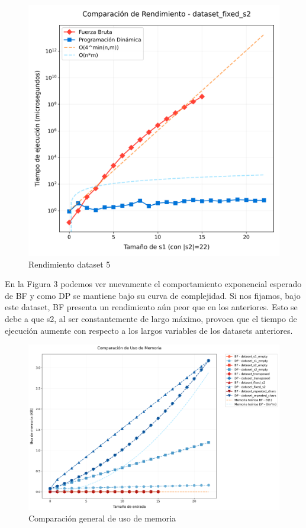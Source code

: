 \begin{figure}[H]
    \centering
    \begin{minipage}[t]{0.5\textwidth}
        \includegraphics[width=\textwidth]{images/comparacion_dataset_fixed_s2.png}  
    \end{minipage}%
    \caption{Rendimiento dataset 5}
    \label{fig:dataset5_general_memoria}
\end{figure}

En la Figura 3 podemos ver nuevamente el comportamiento exponencial esperado de BF y como DP se mantiene bajo su curva de complejidad. 
Si nos fijamos, bajo este dataset, BF presenta un rendimiento aún peor que en los anteriores. Esto se debe a que s2, al ser constantemente de 
largo máximo, provoca que el tiempo de ejecución aumente con respecto a los largos variables de los datasets anteriores. 

\begin{figure}[H]
    \centering
        \includegraphics[width=\textwidth]{images/comparacion_memoria.png}
    \caption{Comparación general de uso de memoria}
    \label{fig:general_memoria}
\end{figure}

